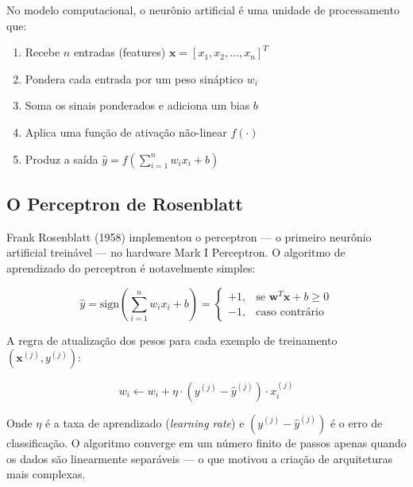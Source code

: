 No modelo computacional, o neurônio artificial é uma unidade de processamento que:
\begin{enumerate}
  \item Recebe $n$ entradas (features) $\mathbf{x} = [x_1, x_2, \ldots, x_n]^T$
  \item Pondera cada entrada por um peso sináptico $w_i$
  \item Soma os sinais ponderados e adiciona um bias $b$
  \item Aplica uma função de ativação não-linear $f(\cdot)$
  \item Produz a saída $\hat{y} = f\left(\sum_{i=1}^{n} w_i x_i + b\right)$
\end{enumerate}

\subsection{O Perceptron de Rosenblatt}

Frank Rosenblatt (1958) implementou o perceptron --- o primeiro neurônio artificial
treinável --- no hardware Mark I Perceptron. O algoritmo de aprendizado do perceptron
é notavelmente simples:

\begin{equation}
  \hat{y} = \text{sign}\left(\sum_{i=1}^{n} w_i x_i + b\right) = \begin{cases}
    +1, & \text{se } \mathbf{w}^T\mathbf{x} + b \geq 0 \\
    -1, & \text{caso contrário}
  \end{cases}
  \label{eq:perceptron}
\end{equation}

A regra de atualização dos pesos para cada exemplo de treinamento $(\mathbf{x}^{(j)}, y^{(j)})$:

\begin{equation}
  w_i \leftarrow w_i + \eta \cdot (y^{(j)} - \hat{y}^{(j)}) \cdot x_i^{(j)}
  \label{eq:perceptron-update}
\end{equation}

Onde $\eta$ é a taxa de aprendizado (\textit{learning rate}) e $(y^{(j)} - \hat{y}^{(j)})$
é o erro de classificação. O algoritmo converge em um número finito de passos apenas
quando os dados são linearmente separáveis --- o que motivou a criação de arquiteturas
mais complexas.

